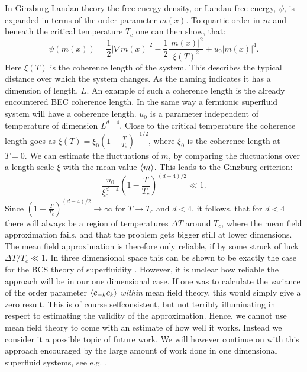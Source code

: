 In Ginzburg-Landau theory the free energy density, or Landau free energy, $\psi$, is expanded in terms of the order parameter $m(x)$. To quartic order in $m$ and beneath the critical temperature $T_c$ one can then show, that:
\begin{equation}
\psi(m(x)) = \frac{1}{2}|\nabla m(x)|^2 - \frac{1}{2} \frac{|m(x)|^2}{\xi(T)^2} + u_0 |m(x)|^4.
\label{eq.LandauFreeEnergy}
\end{equation}
Here $\xi(T)$ is the coherence length of the system. This describes the typical distance over which the system changes. As the naming indicates it has a dimension of length, $L$. An example of such a coherence length is the already encountered BEC coherence length. In the same way a fermionic superfluid system will have a coherence length. $u_0$ is a parameter independent of temperature of dimension $L^{d-4}$. Close to the critical temperature the coherence length goes as $\xi(T) = \xi_0\left(1 - \frac{T}{T_c}\right)^{-1/2}$, where $\xi_0$ is the coherence length at $T = 0$. We can estimate the fluctuations of $m$, by comparing the fluctuations over a length scale $\xi$ with the mean value $\braket{m}$. This leads to the Ginzburg criterion:
\begin{equation}
\frac{u_0}{\xi^{d-4}_0}\left(1 - \frac{T}{T_c}\right)^{(d - 4)/2} \ll 1. 
\label{eq.GinzburgCriterion}
\end{equation}
Since $\left(1 - \frac{T}{T_c}\right)^{(d - 4)/2} \to \infty$ for $T \to T_c$ and $d < 4$, it follows, that for $d < 4$ there will always be a region of temperatures $\Delta T$ around $T_c$, where the mean field approximation fails, and that the problem gets bigger still at lower dimensions. The mean field approximation is therefore only reliable, if by some struck of luck $\Delta T / T_c \ll 1$. In three dimensional space this can be shown to be exactly the case for the BCS theory of superfluidity \cite[p. 373]{PlischkeStatPhys}. However, it is unclear how reliable the approach will be in our one dimensional case. If one was to calculate the variance of the order parameter $\braket{c_{-k}c_k}$ \textit{within} mean field theory, this would simply give a zero result. This is of course selfconsistent, but not terribly illuminating in respect to estimating the validity of the approximation. Hence, we cannot use mean field theory to come with an estimate of how well it works. Instead we consider it a possible topic of future work. We will however continue on with this approach encouraged by the large amount of work done in one dimensional superfluid systems, see e.g. \cite{Alicea, KitaevTopPhases, KitaevQuantumWires, LiYangChen, FuKane2006, GreiterIsingKitaevChain, DeGottardiMajoranaFermions, BudichTopInvMajoranaWires, ZhangWu}. 

